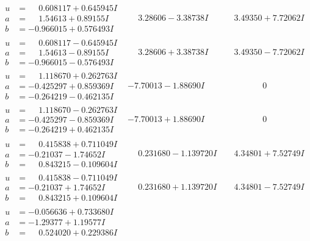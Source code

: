 \documentclass[1p]{elsarticle_modified}
\theoremstyle{definition}
\begin{document}
$$\begin{array}{c|c|c}
\begin{aligned}
u &= \phantom{-}0.608117 + 0.645945 I \\
a &= \phantom{-}1.54613 + 0.89155 I \\
b &= -0.966015 + 0.576493 I\end{aligned}
 & \phantom{-}3.28606 - 3.38738 I & \phantom{-}3.49350 + 7.72062 I \\ \hline\begin{aligned}
u &= \phantom{-}0.608117 - 0.645945 I \\
a &= \phantom{-}1.54613 - 0.89155 I \\
b &= -0.966015 - 0.576493 I\end{aligned}
 & \phantom{-}3.28606 + 3.38738 I & \phantom{-}3.49350 - 7.72062 I \\ \hline\begin{aligned}
u &= \phantom{-}1.118670 + 0.262763 I \\
a &= -0.425297 + 0.859369 I \\
b &= -0.264219 - 0.462135 I\end{aligned}
 & -7.70013 - 1.88690 I & \phantom{-0.000000 } 0 \\ \hline\begin{aligned}
u &= \phantom{-}1.118670 - 0.262763 I \\
a &= -0.425297 - 0.859369 I \\
b &= -0.264219 + 0.462135 I\end{aligned}
 & -7.70013 + 1.88690 I & \phantom{-0.000000 } 0 \\ \hline\begin{aligned}
u &= \phantom{-}0.415838 + 0.711049 I \\
a &= -0.21037 - 1.74652 I \\
b &= \phantom{-}0.843215 - 0.109604 I\end{aligned}
 & \phantom{-}0.231680 - 1.139720 I & \phantom{-}4.34801 + 7.52749 I \\ \hline\begin{aligned}
u &= \phantom{-}0.415838 - 0.711049 I \\
a &= -0.21037 + 1.74652 I \\
b &= \phantom{-}0.843215 + 0.109604 I\end{aligned}
 & \phantom{-}0.231680 + 1.139720 I & \phantom{-}4.34801 - 7.52749 I \\ \hline\begin{aligned}
u &= -0.056636 + 0.733680 I \\
a &= -1.29377 + 1.19577 I \\
b &= \phantom{-}0.524020 + 0.229386 I\end{aligned}

\end{array}$$
\end{document}
